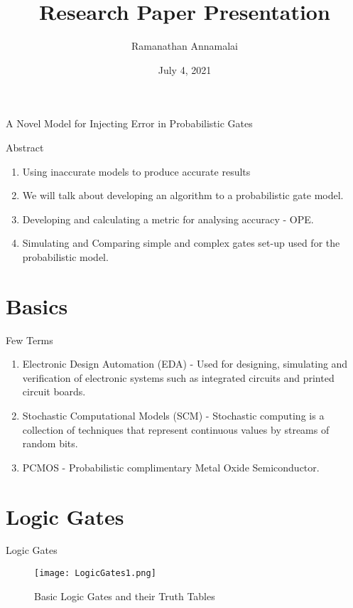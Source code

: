 \documentclass{beamer}
\title{Research Paper Presentation}
\author{Ramanathan Annamalai}
\institute{IIT Hyderabad}
\date{July 4, 2021}
\begin{document}
\begin{frame}
\titlepage
\end{frame}
\section{}
\begin{frame}{A Novel Model for Injecting Error in Probabilistic Gates}
\begin{block}{Abstract}
\begin{enumerate}
    \item Using inaccurate models to produce accurate results
    \item We will talk about developing an algorithm to a probabilistic gate model.
    \item Developing and calculating a metric for analysing accuracy - OPE.
    \item Simulating and Comparing simple and complex gates set-up used for the probabilistic model.
\end{enumerate}
\end{block}
\end{frame}

\section{Basics}
\begin{frame}{Few Terms}
\begin{enumerate}
    \item Electronic Design Automation (EDA) - Used for designing, simulating and verification of electronic systems such as integrated circuits and printed circuit boards.
    \item Stochastic Computational Models (SCM) - Stochastic computing is a collection of techniques that represent continuous values by streams of random bits.
   \item PCMOS - Probabilistic complimentary Metal Oxide Semiconductor.
\end{enumerate}
\end{frame}

\section{Logic Gates}
\begin{frame}{Logic Gates}
\begin{figure}
    \centering
    \texttt{[image: LogicGates1.png]}
    \caption{Basic Logic Gates and their Truth Tables}
    \label{fig:my_label}
\end{figure}
\end{frame}
\end{document}
